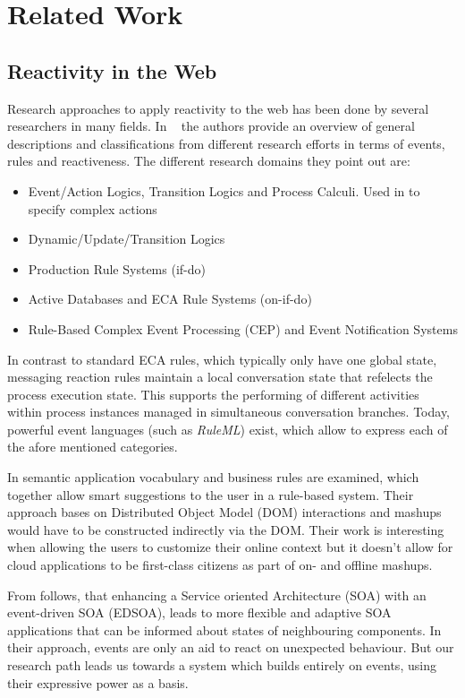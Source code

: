 \documentclass[11pt]{article}%
\begin{document}
\section{Related Work}
\subsection{Reactivity in the Web}
Research approaches to apply reactivity to the web has been done by several researchers in many fields.
In ~\cite{2009-Paschke_Boley-RCER.pdf} the authors provide an overview of general descriptions and classifications from different research efforts in terms of events, rules and reactiveness. The different research domains they point out are:
 \begin{itemize}
  \item Event/Action Logics, Transition Logics and Process Calculi. Used in \cite{Behrends:2008:EEA:1377798.1377801} to specify complex actions
  \item Dynamic/Update/Transition Logics
  \item Production Rule Systems (if-do)
  \item Active Databases and ECA Rule Systems (on-if-do)
  \item Rule-Based Complex Event Processing (CEP) and Event Notification Systems
\end{itemize}
In contrast to standard ECA rules, which typically only have one global state, messaging reaction rules maintain a local conversation state that refelects the process execution state. This supports the performing of different activities within process instances managed in simultaneous conversation branches. Today, powerful event languages (such as \emph{RuleML}) exist, which allow to express each of the afore mentioned categories.

In \cite{2012-Giurca_etal-RuleTheWeb.pdf} semantic application vocabulary and business rules are examined, which together allow smart suggestions to the user in a rule-based system. Their approach bases on Distributed Object Model (DOM) interactions and mashups would have to be constructed indirectly via the DOM. Their work is interesting when allowing the users to customize their online context but it doesn't allow for cloud applications to be first-class citizens as part of on- and offline mashups.

From \cite{2010-Ye_Jacobsen-EEWS.pdf} follows, that enhancing a Service oriented Architecture (SOA) with an event-driven SOA (EDSOA), leads to more flexible and adaptive SOA applications that can be informed about states of neighbouring components. In their approach, events are only an aid to react on unexpected behaviour. But our research path leads us towards a system which builds entirely on events, using their expressive power as a basis.
\end{document}
